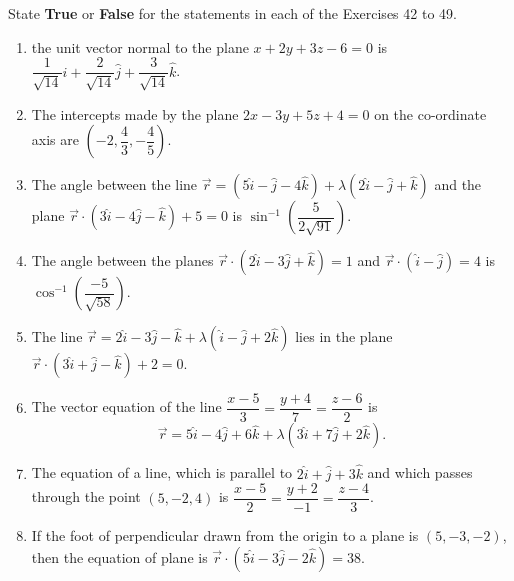\documentclass[12pt]{article}
\providecommand{\brak}[1]{\ensuremath{\left(#1\right)}}
\begin{document}
State \textbf{True} or \textbf{False} for the statements in each of the Exercises 42 to 49.
\begin{enumerate}[resume]
\item the unit vector normal to the plane $x+2y+3z-6=0$ is $\dfrac{1}{\sqrt{14}}\hat{i} + \dfrac{2}{\sqrt{14}}\hat{j} + \dfrac{3}{\sqrt{14}}\hat{k}$.
\item The intercepts made by the plane $2x-3y+5z+4=0$ on the co-ordinate axis are $\brak{-2,\dfrac{4}{3},-\dfrac{4}{5}}$.
\item The angle between the line $\overrightarrow{r}=(5\hat{i}-\hat{j}-4\hat{k})+\lambda(2\hat{i}-\hat{j}+\hat{k})$ and the plane $\overrightarrow{r} \cdot (3\hat{i}-4\hat{j}-\hat{k})+5=0$ is $\sin^{-1}\brak{\dfrac{5}{2\sqrt{91}}}$.
\item The angle between the planes $\overrightarrow{r} \cdot (2\hat{i}-3\hat{j}+\hat{k})=1$ and $\overrightarrow{r} \cdot (\hat{i}-\hat{j})=4$ is $\cos^{-1} \brak{\dfrac{-5}{\sqrt{58}}}$.
\item The line $\overrightarrow{r}=2\hat{i}-3\hat{j}-\hat{k}+\lambda(\hat{i}-\hat{j}+2\hat{k})$ lies in the plane $\overrightarrow{r} \cdot (3\hat{i}+\hat{j}-\hat{k})+2=0$.
\item The vector equation of the line $\dfrac{x-5}{3}=\dfrac{y+4}{7}=\dfrac{z-6}{2}$ is
$$\overrightarrow{r}=5\hat{i}-4\hat{j}+6\hat{k}+\lambda(3\hat{i}+7\hat{j}+2\hat{k}).$$
\item The equation of a line, which is parallel to $2\hat{i}+\hat{j}+3\hat{k}$ and which passes through the point $(5,-2,4)$ is $\dfrac{x-5}{2}=\dfrac{y+2}{-1}=\dfrac{z-4}{3}$.
\item If the foot of perpendicular drawn from the origin to a plane is $(5,-3,-2)$, then the equation of plane is $\overrightarrow{r} \cdot (5\hat{i}-3\hat{j}-2\hat{k})=38.$
\end{enumerate}
\end{document}

